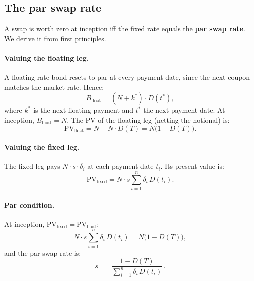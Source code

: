 \subsection{The par swap rate}
\label{sec:fi_par_swap}

A swap is worth zero at inception iff the fixed rate equals the
\textbf{par swap rate}.  We derive it from first principles.

\paragraph{Valuing the floating leg.}
A floating-rate bond resets to par at every payment date, since the
next coupon matches the market rate.  Hence:
\begin{equation}
  B_{\text{float}} = (N + k^*) \cdot D(t^*),
  \label{eq:float_bond}
\end{equation}
where $k^*$ is the next floating payment and $t^*$ the next payment
date.  At inception, $B_{\text{float}} = N$.  The PV of the floating
leg (netting the notional) is:
\begin{equation}
  \text{PV}_{\text{float}} = N - N \cdot D(T) = N\bigl(1 - D(T)\bigr).
  \label{eq:pv_float}
\end{equation}

\paragraph{Valuing the fixed leg.}
The fixed leg pays $N \cdot s \cdot \delta_i$ at each payment date
$t_i$.  Its present value is:
\begin{equation}
  \text{PV}_{\text{fixed}} = N \cdot s \sum_{i=1}^{n} \delta_i \,
    D(t_i).
  \label{eq:pv_fixed}
\end{equation}

\paragraph{Par condition.}
At inception, $\text{PV}_{\text{fixed}} = \text{PV}_{\text{float}}$:
\begin{equation}
  N \cdot s \sum_{i=1}^{n} \delta_i \, D(t_i) = N\bigl(1 - D(T)\bigr),
\end{equation}
and the par swap rate is:
\begin{equation}
  \boxed{s \;=\; \frac{1 - D(T)}{\displaystyle\sum_{i=1}^{n}
    \delta_i \, D(t_i)}}\,.
  \label{eq:par_swap_rate}
\end{equation}

